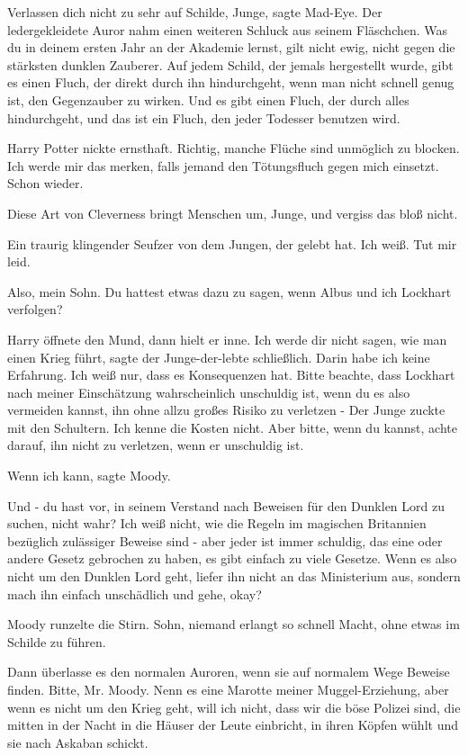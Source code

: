 \glqq{}Verlassen dich nicht zu sehr auf Schilde, Junge\grqq{}, sagte Mad-Eye. Der
ledergekleidete Auror nahm einen weiteren Schluck aus seinem Fläschchen. \glqq{}
Was du in deinem ersten Jahr an der Akademie lernst, gilt nicht ewig, nicht
gegen die stärksten dunklen Zauberer. Auf jedem Schild, der jemals hergestellt
wurde, gibt es einen Fluch, der direkt durch ihn hindurchgeht, wenn man nicht
schnell genug ist, den Gegenzauber zu wirken. Und es gibt einen Fluch, der durch
alles hindurchgeht, und das ist ein Fluch, den jeder Todesser benutzen
wird.\grqq{}

Harry Potter nickte ernsthaft. \glqq{}Richtig, manche Flüche sind unmöglich zu
blocken. Ich werde mir das merken, falls jemand den Tötungsfluch gegen mich
einsetzt. Schon wieder.\grqq{}

\glqq{}Diese Art von Cleverness bringt Menschen um, Junge, und vergiss das bloß
nicht.\grqq{}

Ein traurig klingender Seufzer von dem Jungen, der gelebt hat. \glqq{}Ich weiß.
Tut mir leid.\grqq{}

\glqq{}Also, mein Sohn. Du hattest etwas dazu zu sagen, wenn Albus und ich
Lockhart verfolgen?\grqq{}

Harry öffnete den Mund, dann hielt er inne. \glqq{}Ich werde dir nicht sagen, wie
man einen Krieg führt\grqq{}, sagte der Junge-der-lebte schließlich. \glqq{}Darin
habe ich keine Erfahrung. Ich weiß nur, dass es Konsequenzen hat. Bitte beachte,
dass Lockhart nach meiner Einschätzung wahrscheinlich unschuldig ist, wenn du es
also vermeiden kannst, ihn ohne allzu großes Risiko zu verletzen -\grqq{} Der
Junge zuckte mit den Schultern. \glqq{}Ich kenne die Kosten nicht. Aber bitte,
wenn du kannst, achte darauf, ihn nicht zu verletzen, wenn er unschuldig
ist.\grqq{}

\glqq{}Wenn ich kann\grqq{}, sagte Moody.

\glqq{}Und - du hast vor, in seinem Verstand nach Beweisen für den Dunklen Lord
zu suchen, nicht wahr? Ich weiß nicht, wie die Regeln im magischen Britannien
bezüglich zulässiger Beweise sind - aber jeder ist immer schuldig, das eine oder
andere Gesetz gebrochen zu haben, es gibt einfach zu viele Gesetze. Wenn es also
nicht um den Dunklen Lord geht, liefer ihn nicht an das Ministerium aus, sondern
mach ihn einfach unschädlich und gehe, okay?\grqq{}

Moody runzelte die Stirn. \glqq{}Sohn, niemand erlangt so schnell Macht, ohne
etwas im Schilde zu führen.\grqq{}

\glqq{}Dann überlasse es den normalen Auroren, wenn sie auf normalem Wege Beweise
finden. Bitte, Mr. Moody. Nenn es eine Marotte meiner Muggel-Erziehung, aber
wenn es nicht um den Krieg geht, will ich nicht, dass wir die böse Polizei sind,
die mitten in der Nacht in die Häuser der Leute einbricht, in ihren Köpfen wühlt
und sie nach Askaban schickt.\grqq{}

